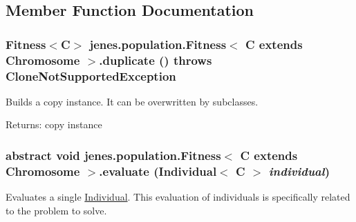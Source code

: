\subsection{Member Function Documentation}
\hypertarget{classjenes_1_1population_1_1_fitness_3_01_c_01extends_01_chromosome_01_4_cea9db9e50fbde7132dc1de0c3baa641}{
\subsubsection[duplicate]{\setlength{\rightskip}{0pt plus 5cm}Fitness$<$C$>$ jenes.population.Fitness$<$ C extends Chromosome $>$.duplicate ()  throws CloneNotSupportedException }}
\label{classjenes_1_1population_1_1_fitness_3_01_c_01extends_01_chromosome_01_4_cea9db9e50fbde7132dc1de0c3baa641}


Builds a copy instance. It can be overwritten by subclasses. 

\begin{Desc}
\item[Returns:]copy instance \end{Desc}
\hypertarget{classjenes_1_1population_1_1_fitness_3_01_c_01extends_01_chromosome_01_4_1e93c0c2af37eb586fe77ad1dc8df761}{
\subsubsection[evaluate]{\setlength{\rightskip}{0pt plus 5cm}abstract void jenes.population.Fitness$<$ C extends Chromosome $>$.evaluate (Individual$<$ C $>$ {\em individual})}}
\label{classjenes_1_1population_1_1_fitness_3_01_c_01extends_01_chromosome_01_4_1e93c0c2af37eb586fe77ad1dc8df761}


Evaluates a single \hyperlink{}{Individual}. This evaluation of individuals is specifically related to the problem to solve. 

